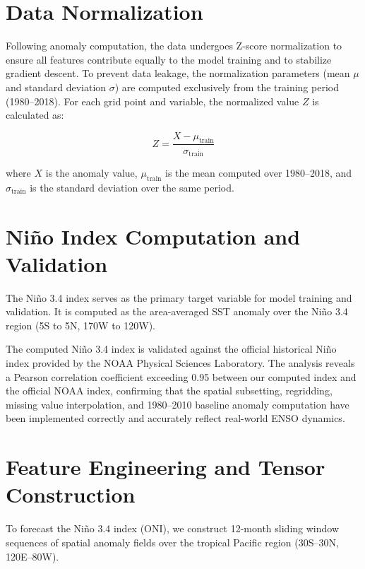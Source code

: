 \section{Data Normalization}

Following anomaly computation, the data undergoes Z-score normalization to ensure all features contribute equally to the model training and to stabilize gradient descent. To prevent data leakage, the normalization parameters (mean $\mu$ and standard deviation $\sigma$) are computed exclusively from the training period (1980--2018). For each grid point and variable, the normalized value $Z$ is calculated as:

\begin{equation}
Z = \frac{X - \mu_{\text{train}}}{\sigma_{\text{train}}}
\end{equation}

where $X$ is the anomaly value, $\mu_{\text{train}}$ is the mean computed over 1980--2018, and $\sigma_{\text{train}}$ is the standard deviation over the same period.

\section{Ni\~{n}o Index Computation and Validation}

The Ni\~{n}o 3.4 index serves as the primary target variable for model training and validation. It is computed as the area-averaged SST anomaly over the Ni\~{n}o 3.4 region (5\degree S to 5\degree N, 170\degree W to 120\degree W).

The computed Ni\~{n}o 3.4 index is validated against the official historical Ni\~{n}o index provided by the NOAA Physical Sciences Laboratory. The analysis reveals a Pearson correlation coefficient exceeding 0.95 between our computed index and the official NOAA index, confirming that the spatial subsetting, regridding, missing value interpolation, and 1980--2010 baseline anomaly computation have been implemented correctly and accurately reflect real-world ENSO dynamics.

\section{Feature Engineering and Tensor Construction}
\label{sec:tensor-construction}

To forecast the Ni\~{n}o 3.4 index (ONI), we construct 12-month sliding window sequences of spatial anomaly fields over the tropical Pacific region (30\degree S--30\degree N, 120\degree E--80\degree W).

